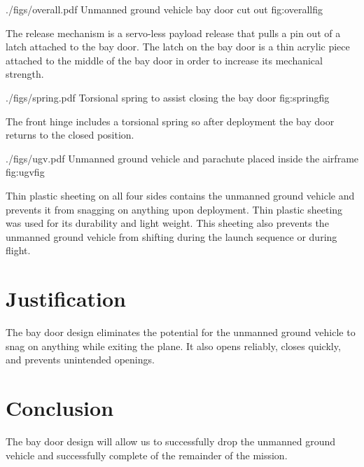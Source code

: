 \documentclass[]{auvsi_doc}
\begin{document}
\AUVSIFigure
{./figs/overall.pdf}
{\textwidth}
{Unmanned ground vehicle bay door cut out}
{fig:overallfig}

The release mechanism is a servo-less payload release that pulls a pin out of a latch attached to the bay door. The latch on the bay door is a thin acrylic piece attached to the middle of the bay door in order to increase its mechanical strength.

\AUVSIFigure
{./figs/spring.pdf}
{\textwidth}
{Torsional spring to assist closing the bay door}
{fig:springfig}

The front hinge includes a torsional spring so after deployment the bay door returns to the closed position.

\AUVSIFigure
{./figs/ugv.pdf}
{\textwidth}
{Unmanned ground vehicle and parachute placed inside the airframe}
{fig:ugvfig}

Thin plastic sheeting on all four sides contains the unmanned ground vehicle and prevents it from snagging on anything upon deployment. Thin plastic sheeting was used for its durability and light weight. This sheeting also prevents the unmanned ground vehicle from shifting during the launch sequence or during flight.

\section{Justification}

The bay door design eliminates the potential for the unmanned ground vehicle to snag on anything while exiting the plane. It also opens reliably, closes quickly, and prevents unintended openings.

\section{Conclusion}

The bay door design will allow us to successfully drop the unmanned ground vehicle and successfully complete of the remainder of the mission.
\end{document}
